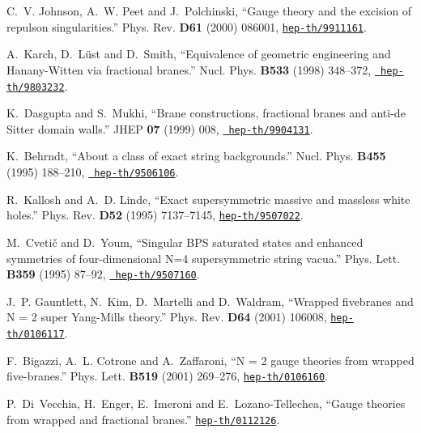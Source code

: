 \documentclass[a4paper,11pt]{article}
\begin{document}
\begin{thebibliography}{10}
C.~V. Johnson, A.~W. Peet and J.~Polchinski, ``Gauge theory and the excision of
  repulson singularities.'' Phys. Rev. {\bf D61} (2000) 086001,
  \href{http://xxx.lanl.gov/abs/hep-th/9911161}{{\tt hep-th/9911161}}.

A.~Karch, D.~L{\"u}st and D.~Smith, ``Equivalence of geometric engineering and
  Hanany-Witten via fractional branes.'' Nucl. Phys. {\bf B533} (1998)
  348--372, \href{http://xxx.lanl.gov/abs/hep-th/9803232}{{\tt
  hep-th/9803232}}. %

K.~Dasgupta and S.~Mukhi, ``Brane constructions, fractional branes and anti-de
  Sitter domain walls.'' JHEP {\bf 07} (1999) 008,
  \href{http://xxx.lanl.gov/abs/http://arXiv.org/abs/hep-th/9904131}{{\tt
  hep-th/9904131}}. %

K.~Behrndt, ``About a class of exact string backgrounds.'' Nucl. Phys. {\bf
  B455} (1995) 188--210, \href{http://xxx.lanl.gov/abs/hep-th/9506106}{{\tt
  hep-th/9506106}}. %

R.~Kallosh and A.~D. Linde, ``Exact supersymmetric massive and massless white
  holes.'' Phys. Rev. {\bf D52} (1995) 7137--7145,
  \href{http://xxx.lanl.gov/abs/hep-th/9507022}{{\tt hep-th/9507022}}.

M.~Cveti\v{c} and D.~Youm, ``Singular BPS saturated states and enhanced
  symmetries of four-dimensional N=4 supersymmetric string vacua.'' Phys. Lett.
  {\bf B359} (1995) 87--92, \href{http://xxx.lanl.gov/abs/hep-th/9507160}{{\tt
  hep-th/9507160}}. %

J.~P. Gauntlett, N.~Kim, D.~Martelli and D.~Waldram, ``Wrapped fivebranes and N
  = 2 super {Yang-Mills} theory.'' Phys. Rev. {\bf D64} (2001) 106008,
  \href{http://xxx.lanl.gov/abs/hep-th/0106117}{{\tt hep-th/0106117}}.

F.~Bigazzi, A.~L. Cotrone and A.~Zaffaroni, ``N = 2 gauge theories from wrapped
  five-branes.'' Phys. Lett. {\bf B519} (2001) 269--276,
  \href{http://xxx.lanl.gov/abs/hep-th/0106160}{{\tt hep-th/0106160}}.

P.~Di~Vecchia, H.~Enger, E.~Imeroni and E.~Lozano-Tellechea, ``Gauge theories
  from wrapped and fractional branes.''
  \href{http://xxx.lanl.gov/abs/hep-th/0112126}{{\tt hep-th/0112126}}.


\end{thebibliography}
\end{document}
